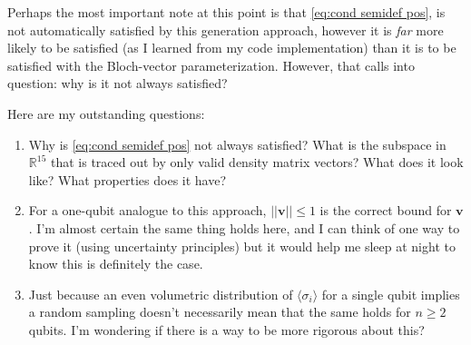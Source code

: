\documentclass{paper}[11pt]
\newcommand{\bv}[1]{\textbf{#1}}
\begin{document}
	Perhaps the most important note at this point is that \cref{eq:cond semidef pos}, is not automatically satisfied by this generation approach, however it is \textit{far} more likely to be satisfied (as I learned from my code implementation) than it is to be satisfied with the Bloch-vector parameterization. However, that calls into question: why is it not always satisfied?
	
	Here are my outstanding questions:
	\begin{enumerate}
		\item Why is \cref{eq:cond semidef pos} not always satisfied? What is the subspace in $\mathbb{R}^{15}$ that is traced out by only valid density matrix vectors? What does it look like? What properties does it have? 
		\item For a one-qubit analogue to this approach, $||\bv{v}||\leq 1$ is the correct bound for $\bv{v}$. I'm almost certain the same thing holds here, and I can think of one way to prove it (using uncertainty principles) but it would help me sleep at night to know this is definitely the case.
		\item Just because an even volumetric distribution of $\langle\sigma_i\rangle$ for a single qubit implies a random sampling doesn't necessarily mean that the same holds for $n\geq 2$ qubits. I'm wondering if there is a way to be more rigorous about this?
		\end{enumerate}	
	
	
	
	
	
	
	
	
	
	
	
	
	
	
\end{document}
